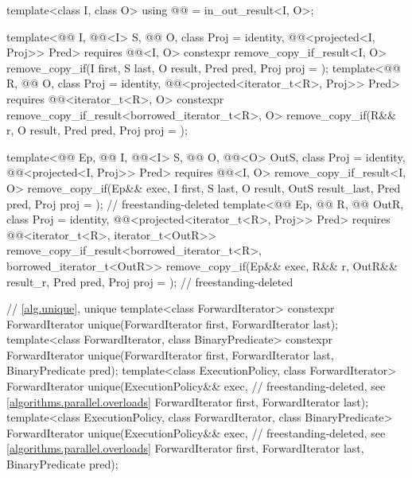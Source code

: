 \begin{codeblock}
{{    template<class I, class O>
      using @@ = in_out_result<I, O>;

    template<@@ I, @@<I> S, @@ O,
             class Proj = identity, @@<projected<I, Proj>> Pred>
      requires @@<I, O>
      constexpr remove_copy_if_result<I, O>
        remove_copy_if(I first, S last, O result, Pred pred, Proj proj = {});
    template<@@ R, @@ O, class Proj = identity,
             @@<projected<iterator_t<R>, Proj>> Pred>
      requires @@<iterator_t<R>, O>
      constexpr remove_copy_if_result<borrowed_iterator_t<R>, O>
        remove_copy_if(R&& r, O result, Pred pred, Proj proj = {});

    template<@@ Ep, @@ I, @@<I> S,
             @@ O, @@<O> OutS,
             class Proj = identity, @@<projected<I, Proj>> Pred>
      requires @@<I, O>
      remove_copy_if_result<I, O>
        remove_copy_if(Ep&& exec, I first, S last, O result, OutS result_last, Pred pred,
                       Proj proj = {});                         // freestanding-deleted
    template<@@ Ep, @@ R, @@ OutR,
             class Proj = identity,
             @@<projected<iterator_t<R>, Proj>> Pred>
      requires @@<iterator_t<R>, iterator_t<OutR>>
      remove_copy_if_result<borrowed_iterator_t<R>, borrowed_iterator_t<OutR>>
        remove_copy_if(Ep&& exec, R&& r, OutR&& result_r, Pred pred,
                       Proj proj = {});                         // freestanding-deleted
  }

  // \ref{alg.unique}, unique
  template<class ForwardIterator>
    constexpr ForwardIterator unique(ForwardIterator first, ForwardIterator last);
  template<class ForwardIterator, class BinaryPredicate>
    constexpr ForwardIterator unique(ForwardIterator first, ForwardIterator last,
                                     BinaryPredicate pred);
  template<class ExecutionPolicy, class ForwardIterator>
    ForwardIterator unique(ExecutionPolicy&& exec,              // freestanding-deleted, see \ref{algorithms.parallel.overloads}
                           ForwardIterator first, ForwardIterator last);
  template<class ExecutionPolicy, class ForwardIterator, class BinaryPredicate>
    ForwardIterator unique(ExecutionPolicy&& exec,              // freestanding-deleted, see \ref{algorithms.parallel.overloads}
                           ForwardIterator first, ForwardIterator last,
                           BinaryPredicate pred);

}
\end{codeblock}
